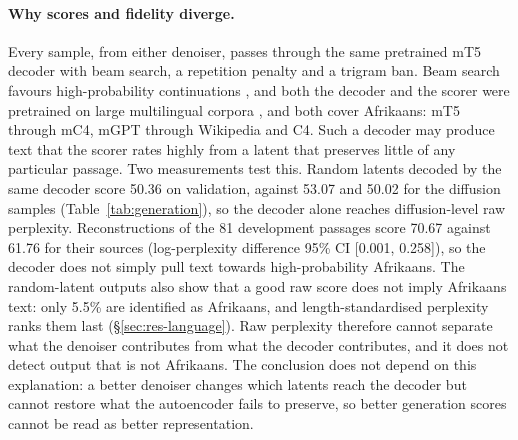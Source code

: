 \documentclass[11pt,a4paper]{article}
\begin{document}
\paragraph{Why scores and fidelity diverge.}
Every sample, from either denoiser, passes through the same pretrained mT5 decoder with beam search, a repetition penalty and a trigram ban. Beam search favours high-probability continuations \citep{holtzman2020curious}, and both the decoder and the scorer were pretrained on large multilingual corpora \citep{xue2021mt5,shliazhko2024mgpt}, and both cover Afrikaans: mT5 through mC4, mGPT through Wikipedia and C4. Such a decoder may produce text that the scorer rates highly from a latent that preserves little of any particular passage. Two measurements test this. Random latents decoded by the same decoder score 50.36 on validation, against 53.07 and 50.02 for the diffusion samples (Table~\ref{tab:generation}), so the decoder alone reaches diffusion-level raw perplexity. Reconstructions of the 81 development passages score 70.67 against 61.76 for their sources (log-perplexity difference 95\% CI [0.001, 0.258]), so the decoder does not simply pull text towards high-probability Afrikaans. The random-latent outputs also show that a good raw score does not imply Afrikaans text: only 5.5\% are identified as Afrikaans, and length-standardised perplexity ranks them last (\S\ref{sec:res-language}). Raw perplexity therefore cannot separate what the denoiser contributes from what the decoder contributes, and it does not detect output that is not Afrikaans.
The conclusion does not depend on this explanation: a better denoiser changes which latents reach the decoder but cannot restore what the autoencoder fails to preserve, so better generation scores cannot be read as better representation.
\end{document}
